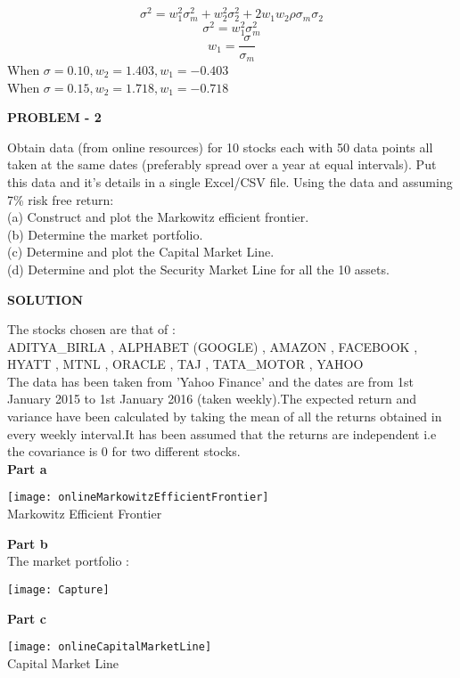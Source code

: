 \documentclass{article}
\begin{document}
$$\sigma^{2} = w_{1}^{2}\sigma_{m}^{2} + w_{2}^{2}\sigma_{2}^{2} + 2w_{1}w_{2}\rho\sigma_{m}\sigma_{2}$$
$$\sigma^{2} = w_{1}^{2}\sigma_{m}^{2}$$
$$w_{1} = \frac{\sigma}{\sigma_{m}}$$
When $\sigma = 0.10, w_{2} = 1.403, w_{1} = -0.403$\\
When $\sigma = 0.15, w_{2} = 1.718, w_{1} = -0.718$\\

\begin{center}
\textbf{PROBLEM - 2}
\end{center}
Obtain data (from online resources) for 10 stocks each with 50 data points all taken at the same dates (preferably spread over a year at equal intervals). Put this data and it’s details in a single Excel/CSV file. Using the data and
assuming 7\% risk free return:\\
(a) Construct and plot the Markowitz efficient frontier.\\
(b) Determine the market portfolio.\\
(c) Determine and plot the Capital Market Line.\\
(d) Determine and plot the Security Market Line for all the 10 assets.\\
\begin{center}
\textbf{SOLUTION}
\end{center}
The stocks chosen are that of :\\
ADITYA\_BIRLA , ALPHABET (GOOGLE) , AMAZON , FACEBOOK , HYATT , MTNL , ORACLE , TAJ , TATA\_MOTOR , YAHOO\\
The data has been taken from 'Yahoo Finance' and the dates are from 1st January 2015 to 1st January 2016 (taken weekly).The expected return and variance have been calculated by taking the mean of all the returns obtained in every weekly interval.It has been assumed that the returns are independent i.e the covariance is 0 for two different stocks.  \\

\textbf{Part a}\\
\begin{center}
\texttt{[image: onlineMarkowitzEfficientFrontier]}\\
Markowitz Efficient Frontier
\end{center}
\newpage
\textbf{Part b}\\
The market portfolio : \\
\begin{center}
\texttt{[image: Capture]}
\end{center}

\textbf{Part c}\\
\begin{center}
\texttt{[image: onlineCapitalMarketLine]}\\
Capital Market Line
\end{center}
\end{document}
